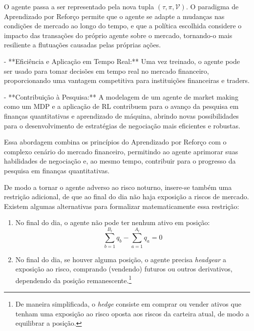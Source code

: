 O agente passa a ser representado pela nova tupla $(\tau, \pi, \mathcal{V})$. O paradigma de Aprendizado por Reforço permite que o agente se adapte a mudanças nas condições de mercado ao longo do tempo, e que a política escolhida considere o impacto das transações do próprio agente sobre o mercado, tornando-o mais resiliente a flutuações causadas pelas próprias ações.

- **Eficiência e Aplicação em Tempo Real:** Uma vez treinado, o agente pode ser usado para tomar decisões em tempo real no mercado financeiro, proporcionando uma vantagem competitiva para instituições financeiras e traders.

- **Contribuição à Pesquisa:** A modelagem de um agente de market making como um MDP e a aplicação de RL contribuem para o avanço da pesquisa em finanças quantitativas e aprendizado de máquina, abrindo novas possibilidades para o desenvolvimento de estratégias de negociação mais eficientes e robustas.

Essa abordagem combina os princípios do Aprendizado por Reforço com o complexo cenário do mercado financeiro, permitindo ao agente aprimorar suas habilidades de negociação e, ao mesmo tempo, contribuir para o progresso da pesquisa em finanças quantitativas.

De modo a tornar o agente adverso ao risco noturno, insere-se também uma restrição adicional, de que ao final do dia não haja exposição a riscos de mercado. 
Existem algumas alternativas para formalizar matematicamente essa restrição:
\begin{enumerate}
    \item No final do dia, o agente não pode ter nenhum ativo em posição: 
    \begin{equation}
        \sum_{b=1}^{B_t} q_b  - \sum_{a=1}^{A_t} q_a = 0\label{eq:eod_restriction}
    \end{equation}
    \item No final do dia, se houver alguma posição, o agente precisa \textit{headgear} a exposição ao risco, comprando (vendendo) futuros ou outros derivativos, dependendo da posição remanescente.\footnote{De maneira simplificada, o \textit{hedge} consiste em comprar ou vender ativos que tenham uma exposição ao risco oposta aos riscos da carteira atual, de modo a equilibrar a posição.}
\end{enumerate}

